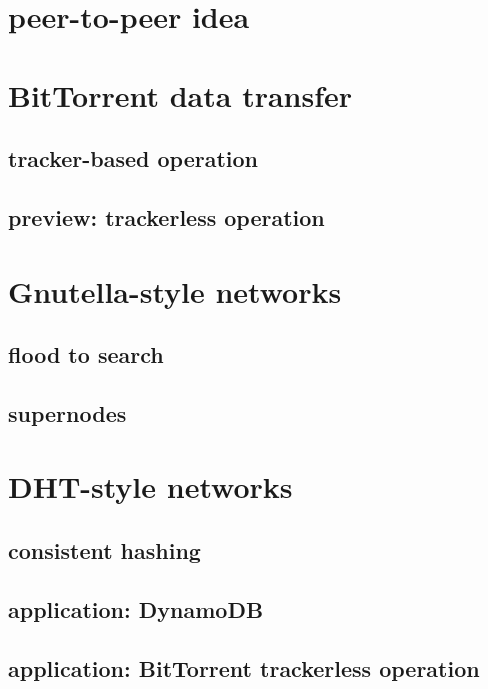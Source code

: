 \section{peer-to-peer idea}



\section{BitTorrent data transfer}



\subsection{tracker-based operation}

\subsection{preview: trackerless operation}

\section{Gnutella-style networks}

\subsection{flood to search}

\subsection{supernodes}

\section{DHT-style networks}

\subsection{consistent hashing}

\subsection{application: DynamoDB}

\subsection{application: BitTorrent trackerless operation}
